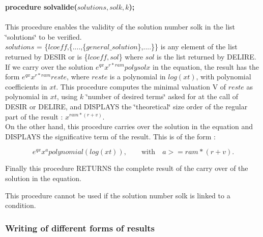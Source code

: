 {\bf procedure solvalide($solutions,solk,k$);} \\
\ \\
This procedure enables the validity of the solution number solk in the list
\char`\"{}solutions\char`\"{} to be verified. \\
$solutions$ = \{$lcoeff$,\{....,\{$general\_solution$\},....\}\} is any element
of the list returned by DESIR or is \{$lcoeff,sol$\} where $sol$ is the list 
returned by DELIRE. \\

If we carry over the solution $e^{qx} x^{r*ram} polysolx$ in the equation, the
result has the form $e^{qx} x^{r*ram} reste$, where $reste$ is a polynomial in
$log(xt)$, with polynomial coefficients in $xt$. This procedure computes the
minimal valuation V of $reste$ as polynomial in $xt$, using $k$ \char`\"{}number
of desired terms\char`\"{} asked for at the call of DESIR or DELIRE, and DISPLAYS
the \char`\"{}theoretical\char`\"{} size order of the regular part of the result
: $x^{ram*(r+v)}$. \\

On the other hand, this procedure carries over the solution in the equation
and DISPLAYS the significative term of the result. This is of the form :

\[e^{qx} x^a polynomial(log(xt)), \qquad \mbox{with} \quad a>=ram*(r+v).\]

Finally this procedure RETURNS the complete result of the carry over of the
solution in the equation. \par
This procedure cannot be used if the solution number solk is linked to a
condition.

\subsubsection{Writing of different forms of results}

